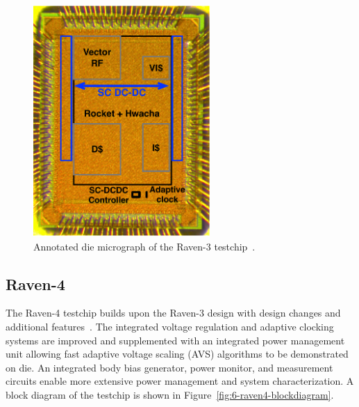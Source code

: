 \documentclass[graybox]{svmult}
\begin{document}
\begin{figure}
  \centering
  \includegraphics[width=0.6\textwidth]{6-raven3-diephoto}
  \caption{Annotated die micrograph of the Raven-3 testchip~\cite{Zimmer2016}.}
  \label{fig:6-raven3-diephoto}
\end{figure}

\subsection{Raven-4}

The Raven-4 testchip builds upon the Raven-3 design with design changes and additional features~\cite{Keller2017}.
The integrated voltage regulation and adaptive clocking systems are improved and supplemented with an integrated power management unit allowing fast adaptive voltage scaling (AVS) algorithms to be demonstrated on die.
An integrated body bias generator, power monitor, and measurement circuits enable more extensive power management and system characterization.
A block diagram of the testchip is shown in Figure~\ref{fig:6-raven4-blockdiagram}.
\end{document}
